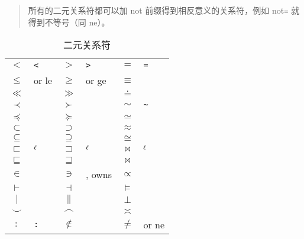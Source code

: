 \documentclass{article}
\makeatletter
\def\lsym{$\mathsurround=0pt {}^\ell$}
\def\LSYM    #1{$#1$     & \texttt{\string#1}\lsym}
\def\SYM     #1{$#1$     & \texttt{\string#1}}
\newenvironment{symbols}[1]%
  {\small\def\arraystretch{1.5
  }
  \begin{tabular}{@{}#1@{}}}%
  {\end{tabular}}
\makeatother
\begin{document}
\begin{table}[htp]
\centering
\caption{二元关系符} \label{tbl:math-rel}
\begin{quote}\footnotesize%
所有的二元关系符都可以加 {not} 前缀得到相反意义的关系符，例如 {not}\texttt{=} 就得到不等号（同 {ne}）。
\end{quote}
\begin{symbols}{*3{cl}}
\hline
 \SYM{<}              & \SYM{>}                    & \SYM{=}          \\
 \SYM{\leq} or {le}   & \SYM{\geq} or {ge} & \SYM{\equiv}     \\
 \SYM{\ll}            & \SYM{\gg}                  & \SYM{\doteq}     \\
 \SYM{\prec}          & \SYM{\succ}                & \SYM{\sim}       \\
 \SYM{\preceq}        & \SYM{\succeq}              & \SYM{\simeq}     \\
 \SYM{\subset}        & \SYM{\supset}              & \SYM{\approx}    \\
 \SYM{\subseteq}      & \SYM{\supseteq}            & \SYM{\cong}      \\
 \LSYM{\sqsubset}     & \LSYM{\sqsupset}           & \LSYM{\Join}     \\
 \SYM{\sqsubseteq}    & \SYM{\sqsupseteq}          & \SYM{\bowtie}    \\
 \SYM{\in}            & \SYM{\ni}, {owns}      & \SYM{\propto}    \\
 \SYM{\vdash}         & \SYM{\dashv}               & \SYM{\models}    \\
 \SYM{\mid}           & \SYM{\parallel}            & \SYM{\perp}      \\
 \SYM{\smile}         & \SYM{\frown}               & \SYM{\asymp}     \\
 \SYM{:}              & \SYM{\notin}               & \SYM{\neq} or {ne} \\
\hline
\end{symbols}
\end{table}
\end{document}
